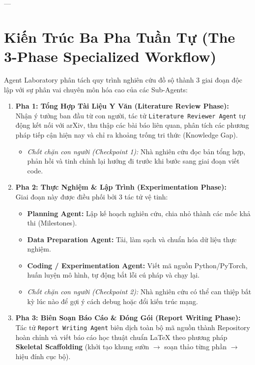 \documentclass[11pt,a4paper]{article}
\begin{document}
---

\section{Kiến Trúc Ba Pha Tuần Tự (The 3-Phase Specialized Workflow)}

Agent Laboratory phân tách quy trình nghiên cứu đồ sộ thành 3 giai đoạn độc lập với sự phân vai chuyên môn hóa cao của các Sub-Agents:

\begin{formulationbox}
\begin{enumerate}[leftmargin=1.5em]
    \item \textbf{Pha 1: Tổng Hợp Tài Liệu Y Văn (Literature Review Phase):}\\
    Nhận ý tưởng ban đầu từ con người, tác tử \texttt{Literature Reviewer Agent} tự động kết nối với arXiv, thu thập các bài báo liên quan, phân tích các phương pháp tiếp cận hiện nay và chỉ ra khoảng trống tri thức (Knowledge Gap).
    \begin{itemize}
        \item \textit{Chốt chặn con người (Checkpoint 1):} Nhà nghiên cứu đọc bản tổng hợp, phản hồi và tinh chỉnh lại hướng đi trước khi bước sang giai đoạn viết code.
    \end{itemize}

    \item \textbf{Pha 2: Thực Nghiệm \& Lập Trình (Experimentation Phase):}\\
    Giai đoạn này được điều phối bởi 3 tác tử vệ tinh:
    \begin{itemize}
        \item \textbf{Planning Agent:} Lập kế hoạch nghiên cứu, chia nhỏ thành các mốc khả thi (Milestones).
        \item \textbf{Data Preparation Agent:} Tải, làm sạch và chuẩn hóa dữ liệu thực nghiệm.
        \item \textbf{Coding / Experimentation Agent:} Viết mã nguồn Python/PyTorch, huấn luyện mô hình, tự động bắt lỗi cú pháp và chạy lại.
    \end{itemize}
    \begin{itemize}
        \item \textit{Chốt chặn con người (Checkpoint 2):} Nhà nghiên cứu có thể can thiệp bất kỳ lúc nào để gợi ý cách debug hoặc đổi kiến trúc mạng.
    \end{itemize}

    \item \textbf{Pha 3: Biên Soạn Báo Cáo \& Đóng Gói (Report Writing Phase):}\\
    Tác tử \texttt{Report Writing Agent} biên dịch toàn bộ mã nguồn thành Repository hoàn chỉnh và viết báo cáo học thuật chuẩn LaTeX theo phương pháp \textbf{Skeletal Scaffolding} (khởi tạo khung sườn $\rightarrow$ soạn thảo từng phần $\rightarrow$ hiệu đính cục bộ).
\end{enumerate}
\end{formulationbox}
\end{document}

